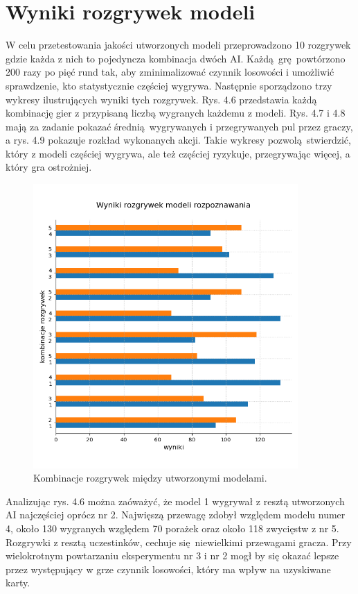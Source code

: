 \documentclass[12pt,oneside,a4paper]{report}
\begin{document}
\section{Wyniki rozgrywek modeli}


W celu przetestowania jakości utworzonych modeli przeprowadzono 10 
rozgrywek gdzie każda z nich to
pojedyncza kombinacja dwóch AI. Każdą grę powtórzono 200 razy po pięć rund tak, aby
zminimalizować czynnik losowości
i umożliwić sprawdzenie, kto statystycznie częściej wygrywa.
Następnie sporządzono trzy wykresy
ilustrujących wyniki tych rozgrywek. Rys. 4.6 przedstawia każdą kombinację gier 
z przypisaną liczbą 
wygranych każdemu z modeli. Rys. 4.7 i 4.8 mają za zadanie pokazać średnią wygrywanych i przegrywanych
pul przez graczy, a rys. 4.9 pokazuje rozkład wykonanych akcji. Takie wykresy pozwolą stwierdzić, który z modeli częściej wygrywa, ale też częściej
ryzykuje, przegrywając więcej, a który gra ostrożniej.


\begin{figure}[!ht]
  \centering
  \hspace*{-1cm}   
  \includegraphics[width=0.9\textwidth]{./img/mecze.png}
  \caption{Kombinacje rozgrywek między utworzonymi modelami.}
\end{figure}


\vspace{3cm}
Analizując rys. 4.6 można zaóważyć, że model 1 wygrywał z resztą utworzonych AI najczęściej oprócz
nr 2.
Najwięszą przewagę 
zdobył względem modelu numer 4, około 130 wygranych względem 70 porażek oraz około 118 zwycięstw z
nr 5. Rozgrywki z resztą
uczestinków, 
cechuje się niewielkimi przewagami gracza. Przy wielokrotnym powtarzaniu eksperymentu nr 3 i
nr 2 mogł by się okazać lepsze przez występujący w grze czynnik losowości, który ma wpływ na
uzyskiwane karty.
\end{document}
